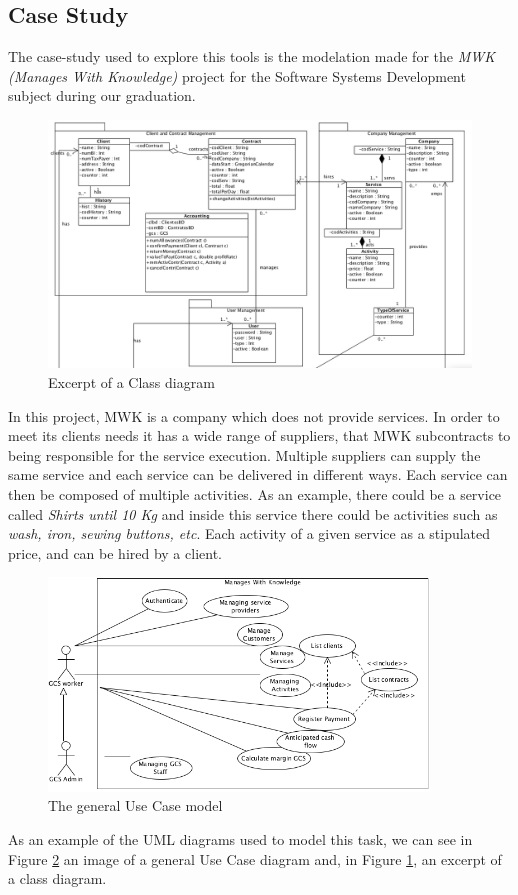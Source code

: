 \subsection*{Case Study}
The case-study used to explore this tools is the modelation made for the \textit{MWK (Manages With Knowledge)} project for the Software Systems Development subject during our graduation.

\begin{figure}[!htbp]
\begin{center}
\includegraphics[scale=0.345]{images/classbw.png}
\caption{Excerpt of a Class diagram}\label{fig:class}
\end{center}
\end{figure} 

In this project, MWK is a company which does not provide services. 
In order to meet its clients needs it has a wide range of suppliers, that MWK subcontracts to being responsible for the service execution.
Multiple suppliers can supply the same service and each  service can be delivered in different ways.
Each service can then be composed of multiple activities. As an example, there could be a service called \textit{Shirts until 10 Kg} and inside this service there could be activities such as \textit{wash, iron, sewing buttons, etc}.
Each activity of a given service as a stipulated price, and can be hired by a client.

\begin{figure}[!htbp]
\begin{center}
\includegraphics[width=0.9\textwidth]{images/usecase.png}
\caption{The general Use Case model}\label{fig:usecase}
\end{center}
\end{figure} 

As an example of the UML diagrams used to model this task, we can see in Figure \ref{fig:usecase} an image of a general Use Case diagram and, in Figure \ref{fig:class}, an excerpt of a class diagram.
